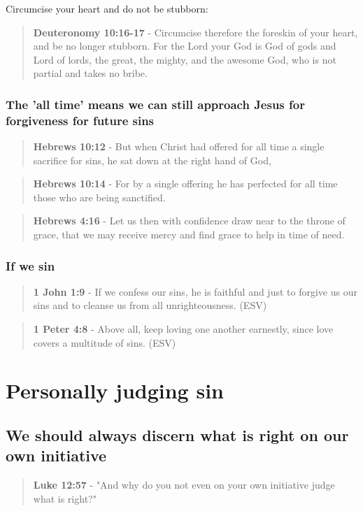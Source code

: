 \documentclass[11pt]{article}
\begin{document}
Circumcise your heart and do not be stubborn:

\begin{quote}
\textbf{Deuteronomy 10:16-17} - Circumcise therefore the foreskin of your heart, and be no longer stubborn. For the Lord your God is God of gods and Lord of lords, the great, the mighty, and the awesome God, who is not partial and takes no bribe.
\end{quote}

\subsubsection{The 'all time' means we can still approach Jesus for forgiveness for future sins}
\label{sec:org875524c}
\begin{quote}
\textbf{Hebrews 10:12} - But when Christ had offered for all time a single sacrifice for sins, he sat down at the right hand of God,
\end{quote}

\begin{quote}
\textbf{Hebrews 10:14} - For by a single offering he has perfected for all time those who are being sanctified.
\end{quote}

\begin{quote}
\textbf{Hebrews 4:16} - Let us then with confidence draw near to the throne of grace, that we may receive mercy and find grace to help in time of need.
\end{quote}

\subsubsection{If we sin}
\label{sec:orgb65cd25}
\begin{quote}
\textbf{1 John 1:9} -  If we confess our sins, he is faithful and just to forgive us our sins and to cleanse us from all unrighteousness.  (ESV)
\end{quote}

\begin{quote}
\textbf{1 Peter 4:8} -  Above all, keep loving one another earnestly, since love covers a multitude of sins.  (ESV)
\end{quote}

\section{Personally judging sin}
\label{sec:org7fa168e}
\subsection{We should always discern what is right on our own initiative}
\label{sec:orgfeaa1db}
\begin{quote}
\textbf{Luke 12:57} - "And why do you not even on your own initiative judge what is right?"
\end{quote}
\end{document}
